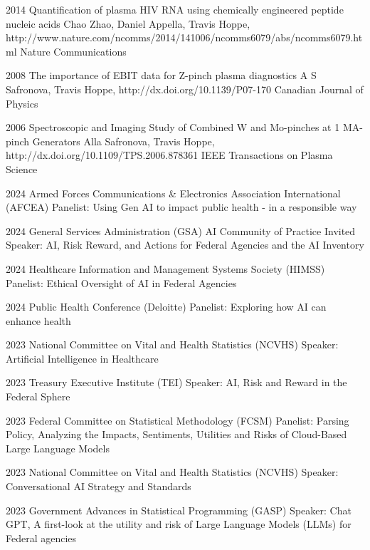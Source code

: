 \documentclass[]{scrartcl}
\begin{document}
\begin{cleanCV}
\Paper
{2014}
{Quantification of plasma HIV RNA using chemically engineered peptide nucleic acids}
{Chao Zhao, Daniel Appella, Travis Hoppe, \etal}
{http://www.nature.com/ncomms/2014/141006/ncomms6079/abs/ncomms6079.html}
{Nature Communications}

\Paper
{2008}
{The importance of EBIT data for Z-pinch plasma diagnostics}
{A S Safronova, Travis Hoppe, \etal}
{http://dx.doi.org/10.1139/P07-170}
{Canadian Journal of Physics}

\Paper
{2006}
{Spectroscopic and Imaging Study of Combined W and Mo-pinches 
  at 1 MA-pinch Generators}
{Alla Safronova, Travis Hoppe, \etal}
{http://dx.doi.org/10.1109/TPS.2006.878361}
{IEEE Transactions on Plasma Science}





\WorkExperienceX
{2024}
{Armed Forces Communications \& Electronics Association International (AFCEA)}
{Panelist: Using Gen AI to impact public health - in a responsible way}

\WorkExperienceX
{2024}
{General Services Administration (GSA) AI Community of Practice}
{Invited Speaker: AI, Risk Reward, and Actions for Federal Agencies and the AI Inventory}

\WorkExperienceX
{2024}
{Healthcare Information and Management Systems Society (HIMSS)}
{Panelist: Ethical Oversight of AI in Federal Agencies}

\WorkExperienceX
{2024}
{Public Health Conference (Deloitte)}
{Panelist: Exploring how AI can enhance health}

\WorkExperienceX
{2023}
{National Committee on Vital and Health Statistics (NCVHS)}
{Speaker: Artificial Intelligence in Healthcare}

\WorkExperienceX
{2023}
{Treasury Executive Institute (TEI)}
{Speaker: AI, Risk and Reward in the Federal Sphere}

\WorkExperienceX
{2023}
{Federal Committee on Statistical Methodology (FCSM)}
{Panelist: Parsing Policy, Analyzing the Impacts, Sentiments, Utilities and Risks of Cloud-Based Large Language Models}

\WorkExperienceX
{2023}
{National Committee on Vital and Health Statistics (NCVHS)}
{Speaker: Conversational AI Strategy and Standards}

\WorkExperienceX
{2023}
{Government Advances in Statistical Programming (GASP)}
{Speaker: Chat GPT, A first-look at the utility and risk of Large Language Models (LLMs) for Federal agencies}


\end{cleanCV}
\end{document}
